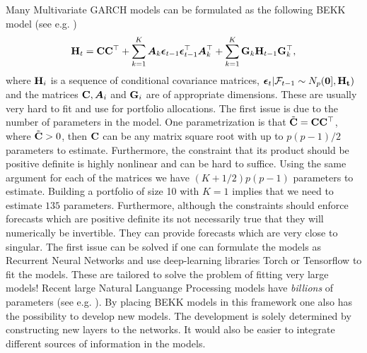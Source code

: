 \documentclass[oneside]{book}\usepackage{knitr}
\begin{document}
Many Multivariate GARCH models can be formulated as the following BEKK model (see e.g. \citet{engle1995multivariate})
\begin{equation}\label{eqn:BEKK}
  \mathbf{H}_t = \mathbf{C} \mathbf{C}^\top + \sum_{k=1}^K \mbox{\boldmath$A$}_k \boldsymbol{\epsilon}_{t-1}\boldsymbol{\epsilon}_{t-1}^\top \mbox{\boldmath$A$}_k^\top + \sum_{k=1}^K \mathbf{G}_k \mathbf{H}_{t-1}\mathbf{G}_k^\top,
\end{equation}
where $\mathbf{H}_i$ is a sequence of conditional covariance matrices, $\boldsymbol{\epsilon}_t | \mathcal{F}_{t-1} \sim N_p(\mathbf{0], \mathbf{H}_t})$ and the matrices $\mathbf{C}, \mbox{\boldmath$A$}_i$ and $\mathbf{G}_i$ are of appropriate dimensions.
These are usually very hard to fit and use for portfolio allocations. 
The first issue is due to the number of parameters in the model.
One parametrization is that $\tilde {\mathbf{C}} = \mathbf{C}\mathbf{C}^\top$, where $\tilde {\mathbf{C}} > 0$, then $\mathbf{C}$ can be any matrix square root with up to $p(p-1)/2$ parameters to estimate. 
Furthermore, the constraint that its product should be positive definite is highly nonlinear and can be hard to suffice.
Using the same argument for each of the matrices we have $(K+1/2)p(p-1)$ parameters to estimate. 
Building a portfolio of size 10 with $K=1$ implies that we need to estimate $135$ parameters.
Furthermore, although the constraints should enforce forecasts which are positive definite its not necessarily true that they will numerically be invertible.
They can provide forecasts which are very close to singular.
The first issue can be solved if one can formulate the models as Recurrent Neural Networks and use deep-learning libraries Torch or Tensorflow to fit the models. 
These are tailored to solve the problem of fitting very large models! 
Recent large Natural Languange Processing models have \textit{billions} of parameters (see e.g. \citet{brown2020language}). 
By placing BEKK models in this framework one also has the possibility to develop new models. 
The development is solely determined by constructing new layers to the networks. 
It would also be easier to integrate different sources of information in the models.

\printbibliography
\end{document}
